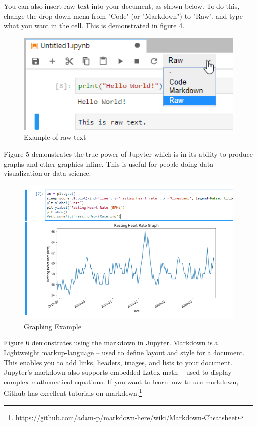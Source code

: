 \documentclass[pdftex,12pt]{artikel3}
\begin{document}
You can also insert raw text into your document, as shown below.
To do this, change the drop-down menu from "Code" (or "Markdown") to "Raw", and type what you want in the cell.
This is demonstrated in figure 4.

\begin{figure}[h!]
    \centering
    \includegraphics[width=15cm]{raw_text_example.png}
    \caption{Example of raw text}
    \label{fig:rawtextexample}
\end{figure}

\newpage

Figure 5 demonstrates the true power of Jupyter which is in its ability to produce graphs and other graphics inline.
This is useful for people doing data visualization or data science.

\begin{figure}[h!]
    \centering
    \includegraphics[width=15cm]{exGraph.PNG}
    \caption{Graphing Example}
    \label{fig:graphingExample}
\end{figure}

\newpage

Figure 6 demonstrates using the markdown in Jupyter. 
Markdown is a Lightweight markup-language -- used to define layout and style for a document.
This enables you to add links, headers, images, and lists to your document.
Jupyter's markdown also supports embedded Latex math -- used to display complex mathematical equations.
If you want to learn how to use markdown, Github has excellent tutorials on markdown.\footnote{\url{https://github.com/adam-p/markdown-here/wiki/Markdown-Cheatsheet}}
\end{document}
